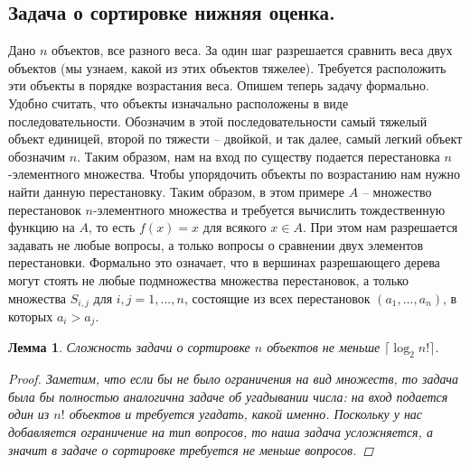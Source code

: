 \documentclass{article}
\newtheorem{lemma}{Лемма}
\begin{document}
\subsection{Задача о сортировке нижняя оценка.}
Дано $n$ объектов, все разного веса. За один шаг разрешается сравнить веса двух объектов (мы узнаем, какой из этих объектов тяжелее). Требуется расположить эти объекты в порядке возрастания веса.
\newline
Опишем теперь задачу формально. Удобно считать, что объекты изначально расположены в виде последовательности. Обозначим в этой последовательности самый тяжелый объект единицей, второй по тяжести -- двойкой, и так далее, самый легкий объект обозначим $n$. Таким образом, нам на вход по существу подается перестановка $n$-элементного множества. Чтобы упорядочить объекты по возрастанию нам нужно найти данную перестановку. Таким образом, в этом примере $A$ -- множество перестановок $n$-элементного множества и требуется вычислить тождественную функцию на $A$, то есть $f(x) = x$ для всякого $x \in A$.
\newline
При этом нам разрешается задавать не любые вопросы, а только вопросы о сравнении двух элементов перестановки. Формально это означает, что в вершинах разрешающего дерева могут стоять не любые подмножества множества перестановок, а только множества $S_{i,j}$ для $i, j = 1, ... , n$, состоящие из всех перестановок $(a_1, . . . , a_n)$, в которых $a_i > a_j$.
\begin{lemma}
Сложность задачи о сортировке $n$ объектов не меньше $\lceil \log_2{n!} \rceil$.
\begin{proof}
Заметим, что если бы не было ограничения на вид множеств, то задача была бы полностью аналогична задаче об угадывании числа: на вход подается один из $n!$ объектов и требуется угадать, какой именно. Поскольку у нас добавляется ограничение на тип вопросов, то наша задача усложняется, а значит в задаче о сортировке требуется не меньше вопросов.
\end{proof}
\end{lemma}
\end{document}

